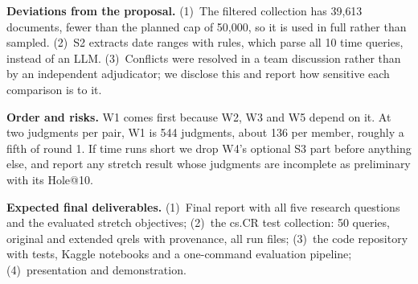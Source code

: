 \documentclass[10pt,a4paper]{article}
\begin{document}
\textbf{Deviations from the proposal.} (1)~The filtered collection has 39{,}613 documents, fewer than the planned
cap of 50{,}000, so it is used in full rather than sampled. (2)~S2 extracts date ranges with rules, which parse
all 10 time queries, instead of an LLM. (3)~Conflicts were resolved in a team discussion rather than by an
independent adjudicator; we disclose this and report how sensitive each comparison is to it.

\textbf{Order and risks.} W1 comes first because W2, W3 and W5 depend on it. At two judgments per pair, W1 is
544 judgments, about 136 per member, roughly a fifth of round 1. If time runs short we drop W4's optional S3
part before anything else, and report any stretch result whose judgments are incomplete as preliminary with
its Hole@10.

\textbf{Expected final deliverables.} (1)~Final report with all five research questions and the evaluated
stretch objectives; (2)~the cs.CR test collection: 50 queries, original and extended qrels with provenance,
all run files; (3)~the code repository with tests, Kaggle notebooks and a one-command evaluation pipeline;
(4)~presentation and demonstration.
\end{document}
